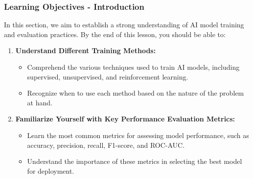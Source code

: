 \documentclass[aspectratio=169]{beamer}
\begin{document}
\begin{frame}[fragile]
    \frametitle{Learning Objectives - Introduction}
    In this section, we aim to establish a strong understanding of AI model training and evaluation practices. By the end of this lesson, you should be able to:
    \begin{enumerate}
        \item \textbf{Understand Different Training Methods:}
        \begin{itemize}
            \item Comprehend the various techniques used to train AI models, including supervised, unsupervised, and reinforcement learning.
            \item Recognize when to use each method based on the nature of the problem at hand.
        \end{itemize}
        \item \textbf{Familiarize Yourself with Key Performance Evaluation Metrics:}
        \begin{itemize}
            \item Learn the most common metrics for assessing model performance, such as accuracy, precision, recall, F1-score, and ROC-AUC.
            \item Understand the importance of these metrics in selecting the best model for deployment.
        \end{itemize}
    \end{enumerate}
\end{frame}
\end{document}

